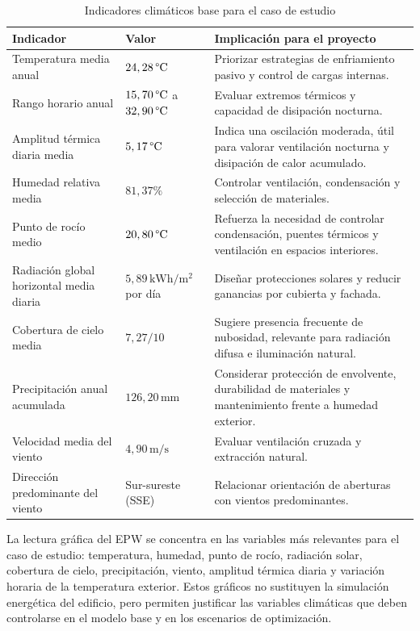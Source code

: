 \begin{table}[H]
  \centering
  \caption{Indicadores climáticos base para el caso de estudio}
  {\fontsize{9}{11}\selectfont
  \begin{tabular}{p{3.8cm}p{2.9cm}p{5.7cm}}
    \toprule
    Indicador & Valor & Implicación para el proyecto \\
    \midrule
    Temperatura media anual & $24,28\,\text{\textdegree C}$ & Priorizar estrategias de enfriamiento pasivo y control de cargas internas. \\
    Rango horario anual & $15,70\,\text{\textdegree C}$ a $32,90\,\text{\textdegree C}$ & Evaluar extremos térmicos y capacidad de disipación nocturna. \\
    Amplitud térmica diaria media & $5,17\,\text{\textdegree C}$ & Indica una oscilación moderada, útil para valorar ventilación nocturna y disipación de calor acumulado. \\
    Humedad relativa media & $81,37\%$ & Controlar ventilación, condensación y selección de materiales. \\
    Punto de rocío medio & $20,80\,\text{\textdegree C}$ & Refuerza la necesidad de controlar condensación, puentes térmicos y ventilación en espacios interiores. \\
    Radiación global horizontal media diaria & $5,89\,\mathrm{kWh}/\mathrm{m}^{2}$ por día & Diseñar protecciones solares y reducir ganancias por cubierta y fachada. \\
    Cobertura de cielo media & $7,27/10$ & Sugiere presencia frecuente de nubosidad, relevante para radiación difusa e iluminación natural. \\
    Precipitación anual acumulada & $126,20\,\mathrm{mm}$ & Considerar protección de envolvente, durabilidad de materiales y mantenimiento frente a humedad exterior. \\
    Velocidad media del viento & $4,90\,\mathrm{m/s}$ & Evaluar ventilación cruzada y extracción natural. \\
    Dirección predominante del viento & Sur-sureste (SSE) & Relacionar orientación de aberturas con vientos predominantes. \\
    \bottomrule
  \end{tabular}
  }
\end{table}

\begin{textoDosTercios}
La lectura gráfica del EPW se concentra en las variables más relevantes para el caso de estudio: temperatura, humedad, punto de rocío, radiación solar, cobertura de cielo, precipitación, viento, amplitud térmica diaria y variación horaria de la temperatura exterior. Estos gráficos no sustituyen la simulación energética del edificio, pero permiten justificar las variables climáticas que deben controlarse en el modelo base y en los escenarios de optimización.
\end{textoDosTercios}


